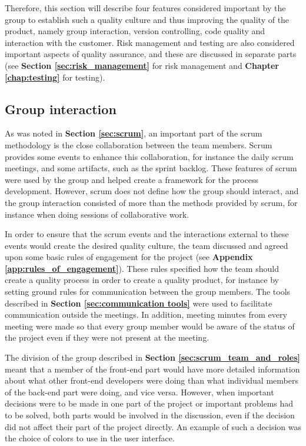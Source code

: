 Therefore, this section will describe four features considered important by the group to establish such a quality culture and thus improving the quality of the product, namely group interaction, version controlling, code quality and interaction with the customer. Risk management and testing are also considered important aspects of quality assurance, and these are discussed in separate parts (see \textbf{Section \ref{sec:risk_management}} for risk management and \textbf{Chapter \ref{chap:testing}} for testing). 

\subsection{Group interaction}

As was noted in \textbf{Section \ref{sec:scrum}}, an important part of the scrum methodology is the close collaboration between the team members. Scrum provides some events to enhance this collaboration, for instance the daily scrum meetings, and some artifacts, such as the sprint backlog. These features of scrum were used by the group and helped create a framework for the process development. However, scrum does not define how the group should interact, and the group interaction consisted of more than the methods provided by scrum, for instance when doing sessions of collaborative work.\newline

In order to ensure that the scrum events and the interactions external to these events would create the desired quality culture, the team discussed and agreed upon some basic rules of engagement for the project (see \textbf{Appendix \ref{app:rules_of_engagement}}). These rules specified how the team should create a quality process in order to create a quality product, for instance by setting ground rules for communication between the group members. The tools described in \textbf{Section \ref{sec:communication tools}} were used to facilitate communication outside the meetings. In addition, meeting minutes from every meeting were made so that every group member would be aware of the status of the project even if they were not present at the meeting.\newline

The division of the group described in \textbf{Section \ref{sec:scrum_team_and_roles}} meant that a member of the front-end part would have more detailed information about what other front-end developers were doing than what individual members of the back-end part were doing, and vice versa. However, when important decisions were to be made in one part of the project or important problems had to be solved, both parts would be involved in the discussion, even if the decision did not affect their part of the project directly. An example of such a decision was the choice of colors to use in the user interface.

